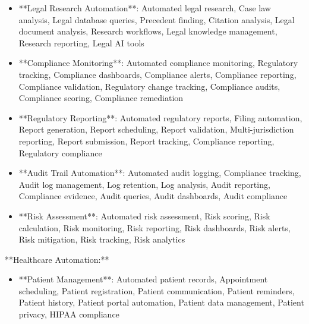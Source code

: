 \documentclass[11pt,a4paper]{article}
\begin{document}
\begin{itemize}
\item **Legal Research Automation**: Automated legal research, Case law analysis, Legal database queries, Precedent finding, Citation analysis, Legal document analysis, Research workflows, Legal knowledge management, Research reporting, Legal AI tools
\end{itemize}

\begin{itemize}
\item **Compliance Monitoring**: Automated compliance monitoring, Regulatory tracking, Compliance dashboards, Compliance alerts, Compliance reporting, Compliance validation, Regulatory change tracking, Compliance audits, Compliance scoring, Compliance remediation
\end{itemize}

\begin{itemize}
\item **Regulatory Reporting**: Automated regulatory reports, Filing automation, Report generation, Report scheduling, Report validation, Multi-jurisdiction reporting, Report submission, Report tracking, Compliance reporting, Regulatory compliance
\end{itemize}

\begin{itemize}
\item **Audit Trail Automation**: Automated audit logging, Compliance tracking, Audit log management, Log retention, Log analysis, Audit reporting, Compliance evidence, Audit queries, Audit dashboards, Audit compliance
\end{itemize}

\begin{itemize}
\item **Risk Assessment**: Automated risk assessment, Risk scoring, Risk calculation, Risk monitoring, Risk reporting, Risk dashboards, Risk alerts, Risk mitigation, Risk tracking, Risk analytics
\end{itemize}

**Healthcare Automation:**

\begin{itemize}
\item **Patient Management**: Automated patient records, Appointment scheduling, Patient registration, Patient communication, Patient reminders, Patient history, Patient portal automation, Patient data management, Patient privacy, HIPAA compliance
\end{itemize}
\end{document}
